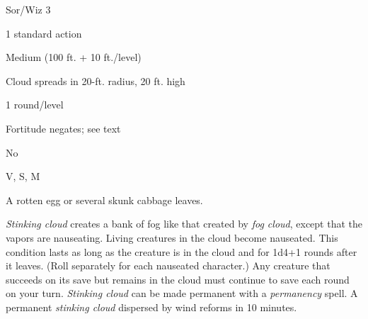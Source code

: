 
\begin{description*}
\item[Level:] Sor/Wiz 3
\item[Casting Time:] 1 standard action
\item[Range:] Medium (100 ft. + 10 ft./level)
\item[Effect:] Cloud spreads in 20-ft. radius, 20 ft. high
\item[Duration:] 1 round/level
\item[Saving Throw:] Fortitude negates; see text
\item[Spell Resistance:] No
\item[Components:] V, S, M
\item[Arcane Material Component:] A rotten egg or several skunk cabbage leaves.
\end{description*}

\textit{Stinking cloud} creates a bank of fog like that created by \textit{fog
cloud}, except that the vapors are nauseating. Living creatures in the cloud become
nauseated. This condition lasts as long as the creature is in the cloud and for
1d4+1 rounds after it leaves. (Roll separately for each nauseated character.) Any
creature that succeeds on its save but remains in the cloud must continue to save
each round on your turn.
\textit{Stinking cloud} can be made permanent with a \textit{permanency} spell.
A permanent \textit{stinking cloud} dispersed by wind reforms in 10 minutes.
